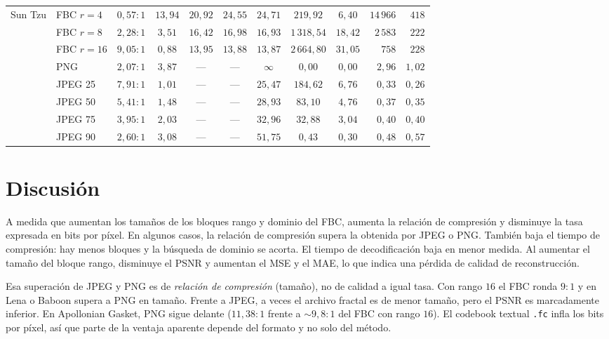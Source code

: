 \documentclass[a4paper]{llncs}
\begin{document}
\begin{table}[htbp]
\begin{tabular}{llcccccccrr}
        Sun Tzu    & FBC $r{=}4$  & $0,57{:}1$  & $13,94$ & $20,92$ & $24,55$ & $24,71$ & $219,92$  & $6,40$  & $14\,966$ & $418$   \\
                   & FBC $r{=}8$  & $2,28{:}1$  & $3,51$  & $16,42$ & $16,98$ & $16,93$ & $1\,318,54$ & $18,42$ & $2\,583$ & $222$ \\
                   & FBC $r{=}16$ & $9,05{:}1$  & $0,88$  & $13,95$ & $13,88$ & $13,87$ & $2\,664,80$ & $31,05$ & $758$   & $228$ \\
                   & PNG          & $2,07{:}1$  & $3,87$  & ---     & ---     & $\infty$ & $0,00$   & $0,00$  & $2,96$    & $1,02$  \\
                   & JPEG 25      & $7,91{:}1$  & $1,01$  & ---     & ---     & $25,47$ & $184,62$  & $6,76$  & $0,33$    & $0,26$  \\
                   & JPEG 50      & $5,41{:}1$  & $1,48$  & ---     & ---     & $28,93$ & $83,10$   & $4,76$  & $0,37$    & $0,35$  \\
                   & JPEG 75      & $3,95{:}1$  & $2,03$  & ---     & ---     & $32,96$ & $32,88$   & $3,04$  & $0,40$    & $0,40$  \\
                   & JPEG 90      & $2,60{:}1$  & $3,08$  & ---     & ---     & $51,75$ & $0,43$    & $0,30$  & $0,48$    & $0,57$  \\

        \bottomrule
    \end{tabular}
\end{table}

\section{Discusión}
\label{sec:discusion}

A medida que aumentan los tamaños de los bloques rango y dominio del FBC, aumenta la relación de compresión y disminuye la tasa expresada en bits por píxel. En algunos casos, la relación de compresión supera la obtenida por JPEG o PNG. También baja el tiempo de compresión: hay menos bloques y la búsqueda de dominio se acorta. El tiempo de decodificación baja en menor medida. Al aumentar el tamaño del bloque rango, disminuye el PSNR y aumentan el MSE y el MAE, lo que indica una pérdida de calidad de reconstrucción.

Esa superación de JPEG y PNG es de \emph{relación de compresión} (tamaño), no de calidad a igual tasa. Con rango $16$ el FBC ronda $9{:}1$ y en Lena o Baboon supera a PNG en tamaño. Frente a JPEG, a veces el archivo fractal es de menor tamaño, pero el PSNR es marcadamente inferior. En Apollonian Gasket, PNG sigue delante ($11{,}38{:}1$ frente a $\sim 9{,}8{:}1$ del FBC con rango $16$). El codebook textual \texttt{.fc} infla los bits por píxel, así que parte de la ventaja aparente depende del formato y no solo del método.
\end{document}
